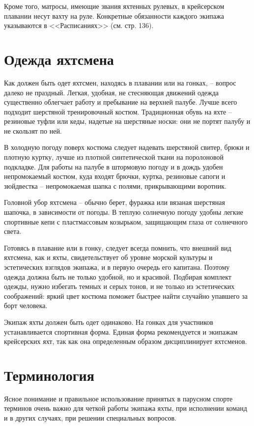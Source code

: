 \documentclass[a4paper, 12pt, twoside, final]{scrbook}
\begin{document}
Кроме того, матросы, имеющие звания яхтенных рулевых, в крейсерском плавании несут вахту на руле. Конкретные обязанности каждого экипажа указываются в <<Расписаниях>> (см. стр. 136).

\section{Одежда яхтсмена}

Как должен быть одет яхтсмен, находясь в плавании или на гонках, \--- вопрос далеко не праздный. Легкая, удобная, не стесняющая движений одежда существенно облегчает работу и пребывание на верхней палубе. Лучше всего подходит шерстяной тренировочный костюм. Традиционная обувь на яхте \--- резиновые туфли или кеды, надетые на шерстяные носки: они не портят палубу и не скользят по ней.

В холодную погоду поверх костюма следует надевать шерстяной свитер, брюки и плотную куртку, лучше из плотной синтетической ткани на поролоновой подкладке. Для работы на палубе в штормовую погоду и в дождь удобен непромокаемый костюм, куда входят брючки, куртка, резиновые сапоги и зюйдвестка \--- непромокаемая шапка с полями, прикрывающими воротник.

Головной убор яхтсмена \--- обычно берет, фуражка или вязаная шерстяная шапочка, в зависимости от погоды. В теплую солнечную погоду удобны легкие спортивные кепи с пластмассовым козырьком, защищающим глаза от солнечного света.

Готовясь в плавание или в гонку, следует всегда помнить, что внешний вид яхтсмена, как и яхты, свидетельствует об уровне морской культуры и эстетических взглядов экипажа, и в первую очередь его капитана. Поэтому одежда должна быть не только удобной, но и красивой. Подбирая комплект одежды, нужно избегать темных и серых тонов, и не только из эстетических соображений: яркий цвет костюма поможет быстрее найти случайно упавшего за борт человека. 

Экипаж яхты должен быть одет одинаково. На гонках для участников устанавливается спортивная форма. Единая форма рекомендуется и экипажам крейсерских яхт, так как она определенным образом дисциплинирует яхтсменов.

\section{Терминология}

Ясное понимание и правильное использование принятых в парусном спорте терминов очень важно для четкой работы экипажа яхты, при исполнении команд и в других случаях, при решении специальных вопросов.
\end{document}
